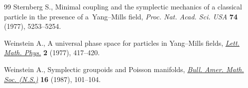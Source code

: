 \documentclass[10pt,a4paper]{amsart}
\numberwithin{equation}{section}
\begin{document}
\begin{thebibliography}{99}
Sternberg S., Minimal coupling and the symplectic mechanics of a classical
 particle in the presence of a~{Y}ang--{M}ills f\/ield, \textit{Proc. Nat. Acad.
 Sci. USA} \textbf{74} (1977), 5253--5254.

Weinstein A., A universal phase space for particles in {Y}ang--{M}ills f\/ields,
 \href{https://doi.org/10.1007/BF00400169}{\textit{Lett. Math. Phys.}} \textbf{2} (1977), 417--420.

Weinstein A., Symplectic groupoids and {P}oisson manifolds, \href{https://doi.org/10.1090/S0273-0979-1987-15473-5}{\textit{Bull. Amer.
 Math. Soc. (N.S.)}} \textbf{16} (1987), 101--104.

\end{thebibliography}
\end{document}
